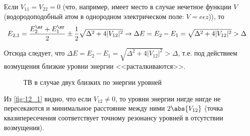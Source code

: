 Если $V_{11} = V_{22} = 0$ (что, например, имеет место в случае нечетное функции $V$ (водородоподобный атом в однородном электрическом поле: $V = e \epsilon z$)), то 
$$
E_{2, 1}=\frac{E_2^\zr + E_1^\zr}{2} \pm \frac{1}{2} \sqrt{\Delta^2 + 4 |V_{12}|^2} \to \Delta E = E_2 - E_1 = \sqrt{\Delta^2 + 4 |V_{12}|^2} > \Delta
$$

Отсюда следует, что $\Delta E = E_2 - E_1 = \sqrt{\Delta^2 + 4 |V_{12}|^2} > \Delta$, т.е. под действием возмущения близкие уровни энергии <<расталкиваются>>.

\begin{figure}[h!]
\centering
{}
\caption{ТВ в случае двух близких по энергии уровней} \label{fig:12_1}
\end{figure}

Из \autoref{fig:12_1} видно, что если $V_{12} \neq 0$, то уровни энергии нигде нигде не пересекаются и минимальное расстояние между ними $2\abs{V_{12}}$ (точка квазипересечения соответствует точному резонансу уровней в отсутствии возмущения).